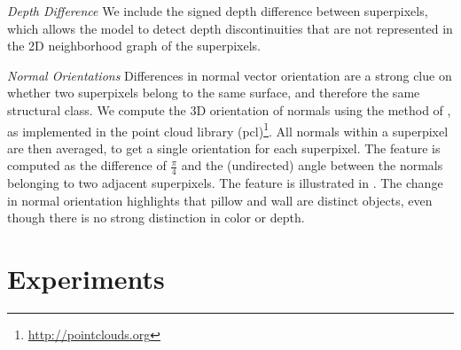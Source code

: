 \emph{Depth Difference}
    We include the signed depth difference between superpixels, which
    allows the model to detect depth discontinuities that are not
    represented in the 2D neighborhood graph of the superpixels.


\emph{Normal Orientations}
    Differences in normal vector orientation are a strong clue on
    whether two superpixels belong to the same surface, and therefore the
    same structural class.
    We compute the 3D orientation of normals using the method of \citet{holz_2011_robocup},
    as implemented in the point cloud library (pcl)\footnote{\url{http://pointclouds.org}}.
    All normals within a superpixel are then averaged, to get a single orientation for each superpixel.
    The feature is computed as the difference of $\frac{\pi}{4}$ and the (undirected) angle between the normals belonging
    to two adjacent superpixels.  
    The feature is illustrated in . The change
    in normal orientation highlights that pillow and wall are distinct
    objects, even though there is no strong distinction in color or depth.


\section{Experiments}


